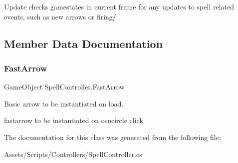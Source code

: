 Update checks gamestates in current frame for any updates to spell related events, such as new arrows or firing/ 

\subsection{Member Data Documentation}
\mbox{\label{class_spell_controller_aa36968ec27a32acb26ec87db86af9415}} 
\subsubsection{\texorpdfstring{Fast\+Arrow}{FastArrow}}
{\footnotesize\ttfamily Game\+Object Spell\+Controller.\+Fast\+Arrow}



Basic arrow to be instantiated on load. 

fastarrow to be instantiated on osucircle click 

The documentation for this class was generated from the following file\+:\begin{DoxyCompactItemize}
\item 
Assets/\+Scripts/\+Controllers/Spell\+Controller.\+cs\end{DoxyCompactItemize}
